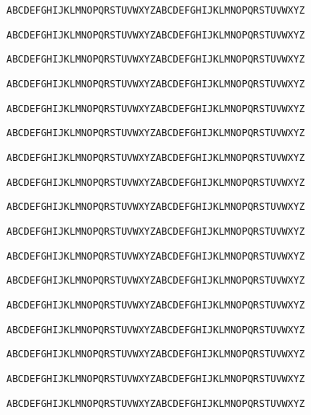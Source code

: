 {\tt ABCDEFGHIJKLMNOPQRSTUVWXYZABCDEFGHIJKLMNOPQRSTUVWXYZ}

\vspace{0.1in}

{\tt ABCDEFGHIJKLMNOPQRSTUVWXYZABCDEFGHIJKLMNOPQRSTUVWXYZ}

\vspace{0.1in}

{\tt ABCDEFGHIJKLMNOPQRSTUVWXYZABCDEFGHIJKLMNOPQRSTUVWXYZ}

\vspace{0.1in}

{\tt ABCDEFGHIJKLMNOPQRSTUVWXYZABCDEFGHIJKLMNOPQRSTUVWXYZ}

\vspace{0.1in}

{\tt ABCDEFGHIJKLMNOPQRSTUVWXYZABCDEFGHIJKLMNOPQRSTUVWXYZ}

\vspace{0.1in}

{\tt ABCDEFGHIJKLMNOPQRSTUVWXYZABCDEFGHIJKLMNOPQRSTUVWXYZ}

\vspace{0.1in}

{\tt ABCDEFGHIJKLMNOPQRSTUVWXYZABCDEFGHIJKLMNOPQRSTUVWXYZ}

\vspace{0.1in}

{\tt ABCDEFGHIJKLMNOPQRSTUVWXYZABCDEFGHIJKLMNOPQRSTUVWXYZ}

\vspace{0.1in}

{\tt ABCDEFGHIJKLMNOPQRSTUVWXYZABCDEFGHIJKLMNOPQRSTUVWXYZ}

\vspace{0.1in}

{\tt ABCDEFGHIJKLMNOPQRSTUVWXYZABCDEFGHIJKLMNOPQRSTUVWXYZ}

\vspace{0.1in}

{\tt ABCDEFGHIJKLMNOPQRSTUVWXYZABCDEFGHIJKLMNOPQRSTUVWXYZ}

\vspace{0.1in}

{\tt ABCDEFGHIJKLMNOPQRSTUVWXYZABCDEFGHIJKLMNOPQRSTUVWXYZ}

\vspace{0.1in}

{\tt ABCDEFGHIJKLMNOPQRSTUVWXYZABCDEFGHIJKLMNOPQRSTUVWXYZ}

\vspace{0.1in}

{\tt ABCDEFGHIJKLMNOPQRSTUVWXYZABCDEFGHIJKLMNOPQRSTUVWXYZ}

\vspace{0.1in}

{\tt ABCDEFGHIJKLMNOPQRSTUVWXYZABCDEFGHIJKLMNOPQRSTUVWXYZ}

\vspace{0.1in}

{\tt ABCDEFGHIJKLMNOPQRSTUVWXYZABCDEFGHIJKLMNOPQRSTUVWXYZ}

\vspace{0.1in}

{\tt ABCDEFGHIJKLMNOPQRSTUVWXYZABCDEFGHIJKLMNOPQRSTUVWXYZ}

